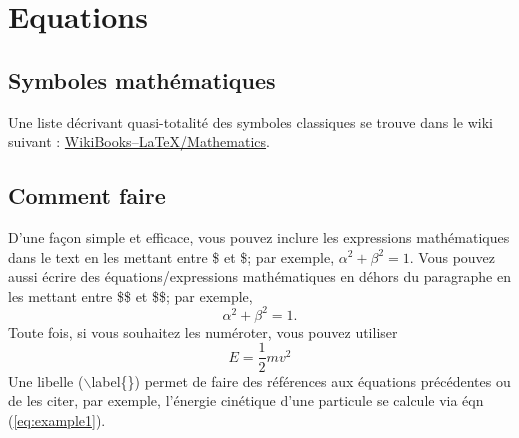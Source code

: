 \documentclass[a4paper,10pt]{report} %
\begin{document}
\section{Equations}
\label{sec:eqn}

\subsection{Symboles mathématiques}
Une liste décrivant quasi-totalité des symboles classiques se trouve dans le wiki suivant : \href{https://en.wikibooks.org/wiki/LaTeX/Mathematics}{WikiBooks--LaTeX/Mathematics}.

\subsection{Comment faire}
D'une façon simple et efficace, vous pouvez inclure les expressions mathématiques dans le text en les mettant entre \$ et \$; par exemple, $\alpha^2 + \beta^2 = 1$. Vous pouvez aussi écrire des équations/expressions mathématiques en déhors du paragraphe en les mettant entre \$\$ et \$\$; par exemple, $$\alpha^2 + \beta^2 = 1.$$
Toute fois, si vous souhaitez les numéroter, vous pouvez utiliser
	\begin{equation}
		E = \frac{1}{2} m v^2
		\label{eq:example1}%
	\end{equation}
Une libelle ($\backslash$label\{\}) permet de faire des références aux équations précédentes ou de les citer, par exemple, l'énergie cinétique d'une particule se calcule via éqn (\ref{eq:example1}).













\end{document}
